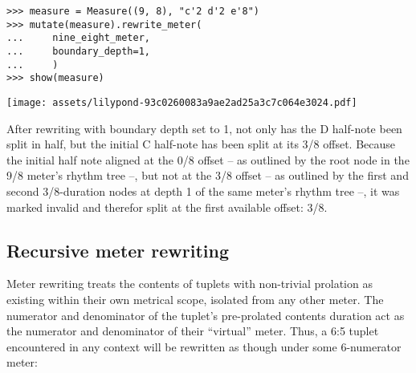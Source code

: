 \begin{comment}
<abjad>
measure = Measure((9, 8), "c'2 d'2 e'8")
mutate(measure).rewrite_meter(
    nine_eight_meter,
    boundary_depth=1,
    )
show(measure)
</abjad>
\end{comment}

\begin{abjadbookoutput}
\begin{singlespacing}
\vspace{-0.5\baselineskip}
\begin{verbatim}
>>> measure = Measure((9, 8), "c'2 d'2 e'8")
>>> mutate(measure).rewrite_meter(
...     nine_eight_meter,
...     boundary_depth=1,
...     )
>>> show(measure)
\end{verbatim}
\noindent\texttt{[image: assets/lilypond-93c0260083a9ae2ad25a3c7c064e3024.pdf]}
\end{singlespacing}
\end{abjadbookoutput}

\noindent After rewriting with boundary depth set to 1, not only has the D
half-note been split in half, but the initial C half-note has been split at its
3/8 offset. Because the initial half note aligned at the 0/8 offset -- as
outlined by the root node in the 9/8 meter's rhythm tree --, but not at the 3/8
offset -- as outlined by the first and second 3/8-duration nodes at depth 1 of
the same meter's rhythm tree --, it was marked invalid and therefor split at
the first available offset: 3/8.

\subsection{Recursive meter rewriting} %

Meter rewriting treats the contents of tuplets with non-trivial prolation as
existing within their own metrical scope, isolated from any other meter. The
numerator and denominator of the tuplet's pre-prolated contents duration act as
the numerator and denominator of their \enquote{virtual} meter. Thus, a 6:5
tuplet encountered in any context will be rewritten as though under some
6-numerator meter:

\begin{comment}
<abjad>
parseable = "abj: | 4/4 c'16 ~ c'4 d'8. ~ "
parseable += "2/3 { d'8. ~ 3/5 { d'16 e'8 ~ e'16 f'16 ~ } } "
parseable += "f'4 |"
measure = parse(parseable)
show(measure)
mutate(measure).rewrite_meter(
    measure,
    boundary_depth=1,
    )
show(measure)
</abjad>
\end{comment}

